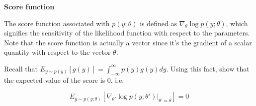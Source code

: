 \item {} \textbf{Score function}

The score function associated with $p(y;\theta)$ is defined as $\nabla_{\theta}\log p(y;\theta)$, which signifies the sensitivity of the likelihood function with respect to the parameters. Note that the score function is actually a vector since it's the gradient of a scalar quantity with respect to the vector $\theta$.

Recall that $E_{y\sim p(y)}[g(y)]=\int_{-\infty}^{\infty}p(y)g(y)dy$. Using this fact, show that the expected value of the score is 0, i.e.

$$E_{y\sim p(y;\theta)}[\nabla_{\theta'} \log p(y;\theta')|_{\theta'=\theta}] = 0$$

